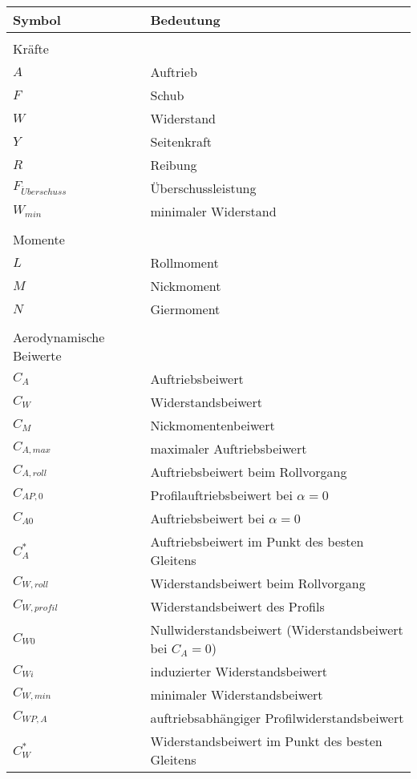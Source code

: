 \begin{table}[H]
	\begin{tabular}{ll}
		\hline
		\textbf{Symbol}\phantom{123456789}& \textbf{Bedeutung} \phantom{123456789123456789123456789123456789}\\ 
		\hline
		\\
		Kräfte\\
		\hline
		$A$					& Auftrieb\\
		$F$					& Schub\\
		$W$					& Widerstand\\
		$Y$					& Seitenkraft\\
		$R$					& Reibung\\
		$F_{\ddot{U}berschuss}$ & Überschussleistung\\
		$W_{min}$			& minimaler Widerstand\\
		\\
		Momente\\
		\hline
		$L$					& Rollmoment\\
		$M$					& Nickmoment\\
		$N$					& Giermoment\\
		\\
		Aerodynamische Beiwerte\\
		\hline
		$C_{A}$				& Auftriebsbeiwert\\
		$C_{W}$				& Widerstandsbeiwert\\
		$C_{M}$				& Nickmomentenbeiwert\\
		$C_{A,max}$			& maximaler Auftriebsbeiwert\\
		$C_{A,roll}$		& Auftriebsbeiwert beim Rollvorgang\\
		$C_{AP,0}$			& Profilauftriebsbeiwert bei $\alpha = 0$\\
		$C_{A0}$			& Auftriebsbeiwert bei $\alpha = 0$\\
		$C^*_A$				& Auftriebsbeiwert im Punkt des besten Gleitens\\
		$C_{W,roll}$		& Widerstandsbeiwert beim Rollvorgang\\
		$C_{W,profil}$		& Widerstandsbeiwert des Profils\\
		$C_{W0}$			& Nullwiderstandsbeiwert (Widerstandsbeiwert bei $C_A=0$)\\
		$C_{Wi}$			& induzierter Widerstandsbeiwert\\
		$C_{W,min}$			& minimaler Widerstandsbeiwert\\
		$C_{WP,A}$			& auftriebsabhängiger Profilwiderstandsbeiwert\\
		$C^*_W$				& Widerstandsbeiwert im Punkt des besten Gleitens\\
		

\end{tabular}
\end{table}
